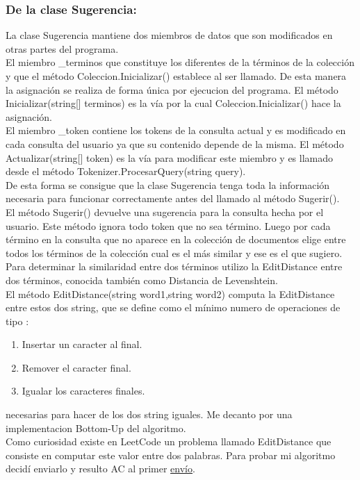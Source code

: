 \documentclass{article}
\begin{document}
\subsubsection{De la clase Sugerencia:}
La clase Sugerencia mantiene dos miembros de datos que son modificados en otras partes del programa.\\
El miembro \_terminos que constituye los diferentes de la términos de la colección y que el método Coleccion.Inicializar() establece al ser llamado. De esta manera la asignación se realiza de forma única por ejecucion del programa. El método Inicializar(string[] terminos) es la vía por la cual Coleccion.Inicializar() hace la asignación.\\
El miembro \_token contiene los tokens de la consulta actual y es modificado en cada consulta del usuario ya que su contenido depende de la misma. El método Actualizar(string[] token) es la vía para modificar este miembro y es llamado desde el método Tokenizer.ProcesarQuery(string query).\\
De esta forma se consigue que la clase Sugerencia tenga toda la información necesaria para funcionar correctamente antes del llamado al método Sugerir().\\
El método Sugerir() devuelve una sugerencia para la consulta hecha por el usuario. Este método ignora todo token que no sea término. Luego por cada término en la consulta que no aparece en la colección de documentos elige entre todos los términos de la colección cual es el más similar y ese es el que sugiero. Para determinar la similaridad entre dos términos utilizo la EditDistance entre dos términos, conocida también como Distancia de Levenshtein.\\
El método EditDistance(string word1,string word2) computa la EditDistance entre estos dos string, que se define como el mínimo numero de operaciones de tipo :\\
\begin{enumerate}
  \item Insertar un caracter al final.
	\item Remover el caracter final.
	\item Igualar los caracteres finales.
\end{enumerate}
necesarias para hacer de los dos string iguales. Me decanto por una implementacion Bottom-Up del algoritmo.\\
Como curiosidad existe en LeetCode un problema llamado EditDistance que consiste en computar este valor entre dos palabras. Para probar mi algoritmo decidí enviarlo y resulto AC al primer \textcolor{blue}{\href{https://leetcode.com/submissions/detail/950932573/}{envío}}.\\
\end{document}
